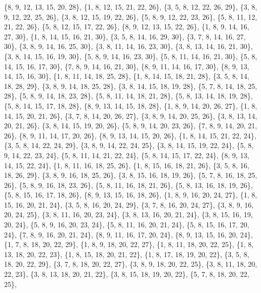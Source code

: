 \documentclass[11pt,a4paper]{article}
\begin{document}
{\{8, 9, 12, 13, 15, 20, 28\}, \{1, 8, 12, 15, 21, 22, 26\}, \{3, 5, 8, 12, 22, 26, 29\}, \{3, 8, 9, 12, 22, 25, 26\}, \{3, 8, 12, 15, 19, 22, 26\},
\{5, 8, 9, 12, 22, 23, 26\}, \{5, 8, 11, 12, 21, 22, 26\}, \{5, 8, 12, 15, 17, 22, 26\}, \{8, 9, 12, 13, 15, 22, 26\}, \{1, 8, 9, 14, 16, 27, 30\},
\{1, 8, 14, 15, 16, 21, 30\}, \{3, 5, 8, 14, 16, 29, 30\}, \{3, 7, 8, 14, 16, 27, 30\}, \{3, 8, 9, 14, 16, 25, 30\}, \{3, 8, 11, 14, 16, 23, 30\},
\{3, 8, 13, 14, 16, 21, 30\}, \{3, 8, 14, 15, 16, 19, 30\}, \{5, 8, 9, 14, 16, 23, 30\}, \{5, 8, 11, 14, 16, 21, 30\}, \{5, 8, 14, 15, 16, 17, 30\},
\{7, 8, 9, 14, 16, 21, 30\}, \{8, 9, 11, 14, 16, 17, 30\}, \{8, 9, 13, 14, 15, 16, 30\}, \{1, 8, 11, 14, 18, 25, 28\}, \{1, 8, 14, 15, 18, 21, 28\},
\{3, 5, 8, 14, 18, 28, 29\}, \{3, 8, 9, 14, 18, 25, 28\}, \{3, 8, 14, 15, 18, 19, 28\}, \{5, 7, 8, 14, 18, 25, 28\}, \{5, 8, 9, 14, 18, 23, 28\},
\{5, 8, 11, 14, 18, 21, 28\}, \{5, 8, 13, 14, 18, 19, 28\}, \{5, 8, 14, 15, 17, 18, 28\}, \{8, 9, 13, 14, 15, 18, 28\}, \{1, 8, 9, 14, 20, 26, 27\},
\{1, 8, 14, 15, 20, 21, 26\}, \{3, 7, 8, 14, 20, 26, 27\}, \{3, 8, 9, 14, 20, 25, 26\}, \{3, 8, 13, 14, 20, 21, 26\}, \{3, 8, 14, 15, 19, 20, 26\},
\{5, 8, 9, 14, 20, 23, 26\}, \{7, 8, 9, 14, 20, 21, 26\}, \{8, 9, 11, 14, 17, 20, 26\}, \{8, 9, 13, 14, 15, 20, 26\}, \{1, 8, 14, 15, 21, 22, 24\},
\{3, 5, 8, 14, 22, 24, 29\}, \{3, 8, 9, 14, 22, 24, 25\}, \{3, 8, 14, 15, 19, 22, 24\}, \{5, 8, 9, 14, 22, 23, 24\}, \{5, 8, 11, 14, 21, 22, 24\},
\{5, 8, 14, 15, 17, 22, 24\}, \{8, 9, 13, 14, 15, 22, 24\}, \{1, 8, 11, 16, 18, 25, 26\}, \{1, 8, 15, 16, 18, 21, 26\}, \{3, 5, 8, 16, 18, 26, 29\},
\{3, 8, 9, 16, 18, 25, 26\}, \{3, 8, 15, 16, 18, 19, 26\}, \{5, 7, 8, 16, 18, 25, 26\}, \{5, 8, 9, 16, 18, 23, 26\}, \{5, 8, 11, 16, 18, 21, 26\},
\{5, 8, 13, 16, 18, 19, 26\}, \{5, 8, 15, 16, 17, 18, 26\}, \{8, 9, 13, 15, 16, 18, 26\}, \{1, 8, 9, 16, 20, 24, 27\}, \{1, 8, 15, 16, 20, 21, 24\},
\{3, 5, 8, 16, 20, 24, 29\}, \{3, 7, 8, 16, 20, 24, 27\}, \{3, 8, 9, 16, 20, 24, 25\}, \{3, 8, 11, 16, 20, 23, 24\}, \{3, 8, 13, 16, 20, 21, 24\},
\{3, 8, 15, 16, 19, 20, 24\}, \{5, 8, 9, 16, 20, 23, 24\}, \{5, 8, 11, 16, 20, 21, 24\}, \{5, 8, 15, 16, 17, 20, 24\}, \{7, 8, 9, 16, 20, 21, 24\},
\{8, 9, 11, 16, 17, 20, 24\}, \{8, 9, 13, 15, 16, 20, 24\}, \{1, 7, 8, 18, 20, 22, 29\}, \{1, 8, 9, 18, 20, 22, 27\}, \{1, 8, 11, 18, 20, 22, 25\},
\{1, 8, 13, 18, 20, 22, 23\}, \{1, 8, 15, 18, 20, 21, 22\}, \{1, 8, 17, 18, 19, 20, 22\}, \{3, 5, 8, 18, 20, 22, 29\}, \{3, 7, 8, 18, 20, 22, 27\},
\{3, 8, 9, 18, 20, 22, 25\}, \{3, 8, 11, 18, 20, 22, 23\}, \{3, 8, 13, 18, 20, 21, 22\}, \{3, 8, 15, 18, 19, 20, 22\}, \{5, 7, 8, 18, 20, 22, 25\},
}
\end{document}
